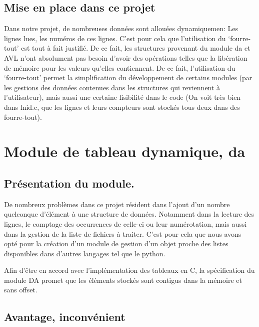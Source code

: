 \documentclass[12pt]{article}
\begin{document}
    \subsection{Mise en place dans ce projet}

    Dans notre projet, de nombreuses données sont allouées dynamiquemen\@: Les 
    lignes lues, les numéros de ces lignes. C'est pour cela que l'utilisation du 
    `fourre-tout' est tout à fait justifié. De ce fait, les structures 
    provenant du module da et AVL n'ont absolument pas besoin d'avoir des
    opérations telles que la libération de mémoire pour les valeurs qu'elles 
    contiennent. De ce fait, l'utilisation du `fourre-tout' permet la 
    simplification du développement de certains modules (par les gestions des 
    données contenues dans les structures qui reviennent à l'utilisateur), mais 
    aussi une certaine lisibilité dans le code (On voit très bien dans lnid.c,
    que les lignes et leurs compteurs sont stockés tous deux dans des 
    fourre-tout).

    \newpage

    \section{Module de tableau dynamique, da}

    \subsection{Présentation du module.}

    De nombreux problèmes dans ce projet résident dans l'ajout d'un nombre 
    quelconque d'élément à une structure de données. Notamment dans la 
    lecture des lignes, le comptage des occurrences de celle-ci ou leur 
    numérotation, mais aussi dans la gestion de la liste de fichiers à 
    traiter. C'est pour cela que nous avons opté pour la création d'un 
    module de gestion d'un objet proche des listes disponibles dans d'autres 
    langages tel que le python. 

    Afin d'être en accord avec l'implémentation des tableaux en C, la 
    spécification du module DA promet que les éléments stockés sont 
    contigus dans la mémoire et sans offset.
    
    \subsection{Avantage, inconvénient}
\end{document}
